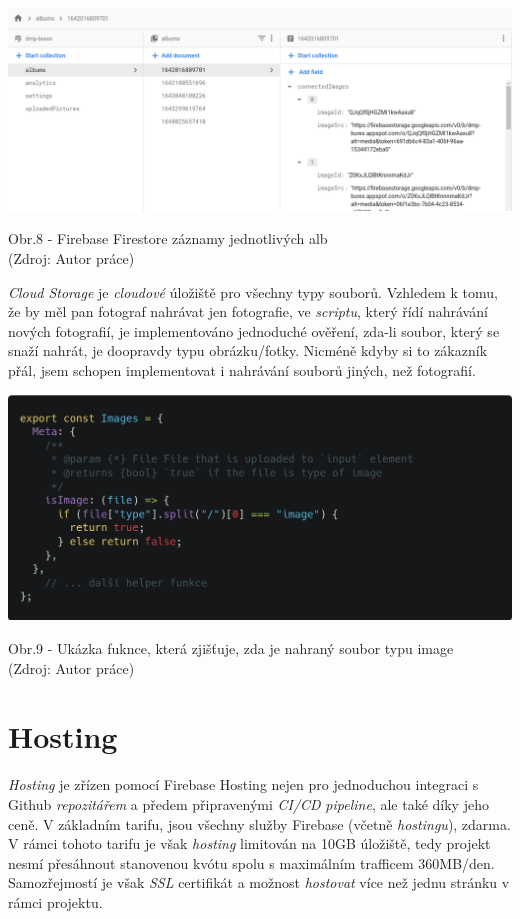 \documentclass[12pt,a4paper]{report}
\begin{document}
  \vspace*{0.5cm}
  \noindent\includegraphics[width=\linewidth]{firestore.png}
  \begin{center}
    Obr.8 - Firebase Firestore záznamy jednotlivých alb \\
    (Zdroj: Autor práce)
  \end{center}
  \vspace*{0.5cm}

  \emph{Cloud Storage} je \emph{cloudové} úložiště pro všechny typy souborů. Vzhledem k tomu, že by měl pan
  fotograf nahrávat jen fotografie, ve \emph{scriptu}, který řídí nahrávání nových fotografií, je
  implementováno jednoduché ověření, zda-li soubor, který se snaží nahrát, je doopravdy typu
  obrázku/fotky. Nicméně kdyby si to zákazník přál, jsem schopen implementovat i nahrávání
  souborů jiných, než fotografií.

  \vspace*{0.5cm}
  \noindent\includegraphics[width=\linewidth]{imagesHelperCodeblock.png}
  \begin{center}
    Obr.9 - Ukázka fuknce, která zjišťuje, zda je nahraný soubor typu image \\
    (Zdroj: Autor práce)
  \end{center}
  \vspace*{0.5cm}

  \section{Hosting}
  \emph{Hosting} je zřízen pomocí Firebase Hosting nejen pro jednoduchou integraci s Github \emph{repozitářem}
  a předem připravenými \emph{CI/CD} \emph{pipeline}, ale také díky jeho ceně. V základním tarifu, jsou všechny služby
  Firebase (včetně \emph{hostingu}), zdarma. V rámci tohoto tarifu je však \emph{hosting} limitován na 10GB úložiště, tedy projekt 
  nesmí přesáhnout stanovenou kvótu spolu s maximálním trafficem 360MB/den. Samozřejmostí je však \emph{SSL} certifikát a možnost
  \emph{hostovat} více než jednu stránku v rámci projektu.
\end{document}
